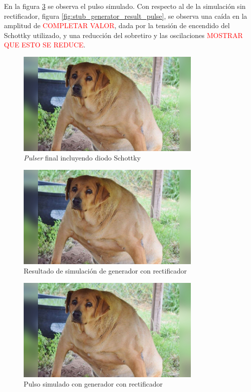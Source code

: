 En la figura \ref{fig:schottky_generator_result_pulse} se observa el pulso
simulado. Con respecto al de la simulación sin rectificador, figura
\ref{fig:stub_generator_result_pulse}, se observa una caída en la amplitud de
\textcolor{red}{COMPLETAR VALOR}, dada por la tensión de encendido del Schottky
utilizado, y una reducción del sobretiro y las oscilaciones
\textcolor{red}{MOSTRAR QUE ESTO SE REDUCE}.

\begin{figure}[tbp]
    \centering
    \includegraphics[width=0.8\textwidth]{images/placeholder.jpg}
    \caption{\textit{Pulser} final incluyendo diodo Schottky}
    \label{fig:pulser_final_schematic}
\end{figure}

\begin{figure}[tbp]
    \centering
    \includegraphics[width=0.8\textwidth]{images/placeholder.jpg}
    \caption{Resultado de simulación de generador con rectificador}
    \label{fig:generator_schottky_result_waves}
\end{figure}

\begin{figure}[tbp]
    \centering
    \includegraphics[width=0.8\textwidth]{images/placeholder.jpg}
    \caption{Pulso simulado con generador con rectificador}
    \label{fig:schottky_generator_result_pulse}
\end{figure}

